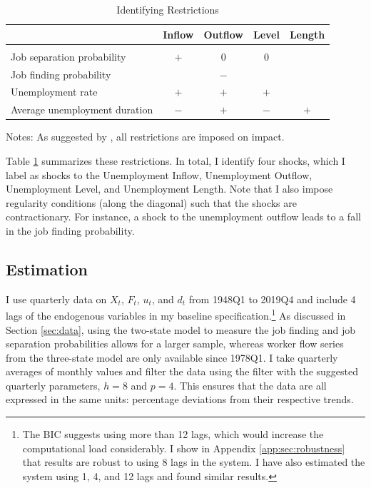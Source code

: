 \documentclass[12pt]{article}
\begin{document}
\begin{table}[t!]
\centering
\caption{Identifying Restrictions}\label{tab:zero_sign_restrictions}
\begin{threeparttable}
\begin{tabular}{l c c c c}
\toprule
& Inflow & Outflow & Level & Length \\\hline
& & & & \\[-0.25cm]
Job separation probability & $+$ & $0$ & $0$ & \\
Job finding probability & & $-$ & & \\
Unemployment rate & $+$ & $+$ & $+$ & \\
Average unemployment duration & $-$ & $+$ & $-$ & $+$ \\
\bottomrule
\end{tabular}
\begin{tablenotes}\footnotesize
Notes: As suggested by \cite{Arias:2018aa}, all restrictions are imposed on impact. 
\end{tablenotes}
\end{threeparttable}
\end{table}

Table \ref{tab:zero_sign_restrictions} summarizes these restrictions. In total, I identify four shocks, which I label as shocks to the Unemployment Inflow, Unemployment Outflow, Unemployment Level, and Unemployment Length. Note that I also impose regularity conditions (along the diagonal) such that the shocks are contractionary. For instance, a shock to the unemployment outflow leads to a fall in the job finding probability.

\subsection{Estimation}

I use quarterly data on $X_t$, $F_t$, $u_t$, and $d_t$ from 1948Q1 to 2019Q4 and include 4 lags of the endogenous variables in my baseline specification.\footnote{The BIC suggests using more than 12 lags, which would increase the computational load considerably. I show in Appendix \ref{app:sec:robustness} that results are robust to using 8 lags in the system. I have also estimated the system using 1, 4, and 12 lags and found similar results.} As discussed in Section \ref{sec:data}, using the two-state model to measure the job finding and job separation probabilities allows for a larger sample, whereas worker flow series from the three-state model are only available since 1978Q1. I take quarterly averages of monthly values and filter the data using the \cite{Hamilton:2018aa} filter with the suggested quarterly parameters, $h = 8$ and $p = 4$. This ensures that the data are all expressed in the same units: percentage deviations from their respective trends.
\end{document}

